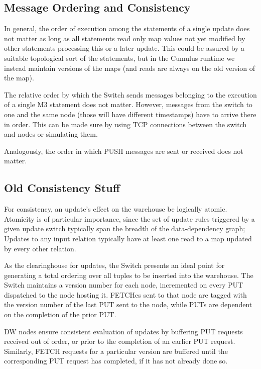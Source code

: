 \subsection{Message Ordering and Consistency}


In general, the order of execution among the statements of a single update
does not matter as long as all
statements read only map values not yet modified by other statements processing
this or a later update.
This could be assured by a suitable topological sort of
the statements, but in the Cumulus runtime we instead maintain versions of
the maps (and reads are always on the old version of the map).

The relative order by which the Switch sends messages
belonging to the execution of a single M3 statement does not matter.
However, messages from the switch to one and the same node
(those will have different timestamps) have to arrive there in order.
This can be made sure by using TCP connections between the switch and nodes
or simulating them.

Analogously, the order in which PUSH messages are sent or received does not matter.



\subsection{Old Consistency Stuff}


For consistency, an update's effect on the warehouse be logically atomic.  Atomicity is of particular importance, since the set of update rules triggered by a given update switch typically span the breadth of the data-dependency graph; Updates to any input relation typically have at least one read to a map updated by every other relation.

As the clearinghouse for updates, the Switch presents an ideal point for generating a total ordering over all tuples to be inserted into the warehouse.  The Switch maintains a version number for each node, incremented on every PUT dispatched to the node hosting it.  FETCHes sent to that node are tagged with the version number of the last PUT sent to the node, while PUTs are dependent on the completion of the prior PUT.

DW nodes ensure consistent evaluation of updates by buffering PUT requests received out of order, or prior to the completion of an earlier PUT request.  Similarly, FETCH requests for a particular version are buffered until the corresponding PUT request has completed, if it has not already done so.

